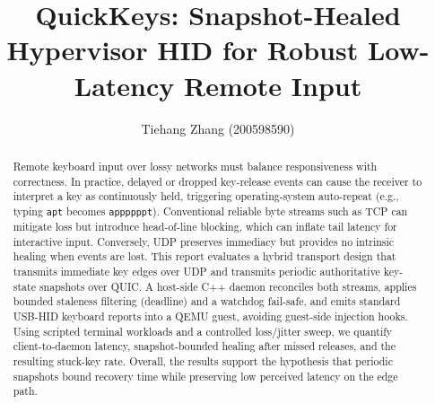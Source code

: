 \documentclass[11pt]{article}
\title{QuickKeys: Snapshot-Healed Hypervisor HID for Robust Low-Latency Remote Input}
\author{Tiehang Zhang (200598590)}
\date{}
\begin{document}
\maketitle
\tableofcontents
\newpage

\begin{abstract}
Remote keyboard input over lossy networks must balance responsiveness with correctness. In practice, delayed or dropped key-release events can cause the receiver to interpret a key as continuously held, triggering operating-system auto-repeat (e.g., typing \texttt{apt} becomes \texttt{appppppt}). Conventional reliable byte streams such as TCP can mitigate loss but introduce head-of-line blocking, which can inflate tail latency for interactive input. Conversely, UDP preserves immediacy but provides no intrinsic healing when events are lost. This report evaluates a hybrid transport design that transmits immediate key edges over UDP and transmits periodic authoritative key-state snapshots over QUIC. A host-side C++ daemon reconciles both streams, applies bounded staleness filtering (deadline) and a watchdog fail-safe, and emits standard USB-HID keyboard reports into a QEMU guest, avoiding guest-side injection hooks. Using scripted terminal workloads and a controlled loss/jitter sweep, we quantify client-to-daemon latency, snapshot-bounded healing after missed releases, and the resulting stuck-key rate. Overall, the results support the hypothesis that periodic snapshots bound recovery time while preserving low perceived latency on the edge path.
\end{abstract}
\end{document}
